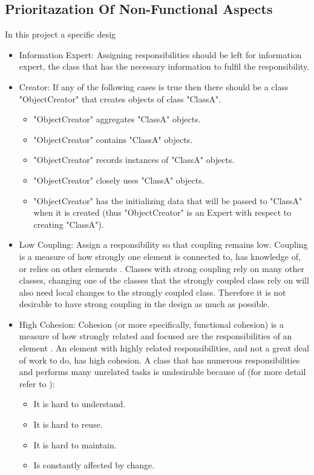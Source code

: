 \documentclass[10pt, a4paper, titlepage]{article}
\begin{document}
\subsection{Prioritazation Of Non-Functional Aspects}
In this project a specific desig
\begin{itemize}
\item Information Expert: Assigning responsibilities should be left for information expert, the class that has the necessary information to fulfil the responsibility. 
\item Creator: If any of the following cases is true then there should be a class "ObjectCreator" that creates objects of class "ClassA".
\begin{itemize}
\item "ObjectCreator" aggregates "ClassA" objects.
\item "ObjectCreator" contains "ClassA" objects.
\item "ObjectCreator" records instances of "ClassA" objects.
\item "ObjectCreator" closely uses "ClassA" objects.
\item "ObjectCreator" has the initializing data that will be passed to "ClassA" when it is created (thus "ObjectCreator" is an Expert with respect to creating "ClassA").
\end{itemize}  
\item Low Coupling: Assign a responsibility so that coupling remains low. Coupling is a measure of how strongly one element is connected to, has knowledge of, or relies on other elements \cite{Larman_book}. Classes with strong coupling rely on many other classes, changing one of the classes that the strongly coupled class rely on will also need local changes to the strongly coupled class. Therefore it is not desirable to have strong coupling in the design as much as possible.
\item High Cohesion: Cohesion (or more specifically, functional cohesion) is a measure of how strongly related and focused are the responsibilities of an element \cite{Larman_book}. An element with highly related responsibilities, and not a great deal of work to do, has high cohesion. A class that has numerous responsibilities and performs many unrelated tasks is undesirable because of (for more detail refer to \cite{Larman_book}):
\begin{itemize}
\item It is hard to understand.
\item It is hard to reuse.
\item It is hard to maintain.
\item Is constantly affected by change.
\end{itemize}


\end{itemize}
\end{document}
